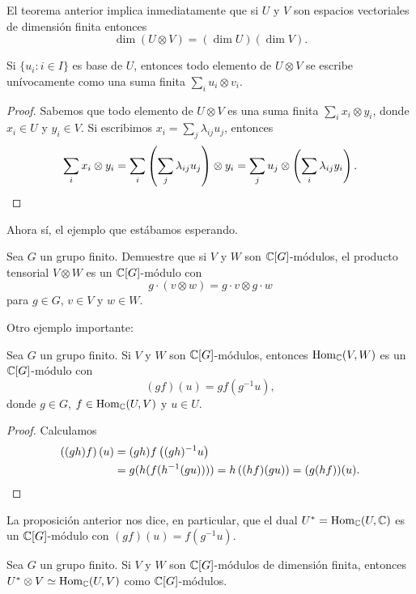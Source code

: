 El teorema anterior implica inmediatamente que si $U$ y $V$ son espacios
vectoriales de dimensión finita entonces
\[
	\dim(U\otimes V)=(\dim U)(\dim V).
\]

\begin{corollary}
	Si $\{u_i:i\in I\}$ es base de $U$, entonces todo elemento de $U\otimes V$
	se escribe unívocamente como una suma finita $\sum_{i}u_i\otimes v_i$.
\end{corollary}

\begin{proof}
	Sabemos que todo elemento de $U\otimes V$ es una suma finita
	$\sum_i x_i\otimes y_i$, donde $x_i\in U$ y $y_i\in V$. Si escribimos 
	$x_i=\sum_j\lambda_{ij}u_j$, entonces
	\[
		\sum_i x_i\otimes y_i=\sum_i\left(\sum_j\lambda_{ij}u_j\right)\otimes y_i		
		=\sum_j u_j\otimes\left(\sum_i\lambda_{ij}y_i\right).\qedhere
	\]
\end{proof}

Ahora sí, el ejemplo que estábamos esperando. 

\begin{exercise}
	Sea $G$ un grupo finito. Demuestre que si $V$ y $W$ son $\mathbb{C}[G]$-módulos, el producto
	tensorial $V\otimes W$ es un $\mathbb{C}[G]$-módulo con 
	\[
	g\cdot (v\otimes w)=g\cdot v\otimes
	g\cdot w
	\]
	para $g\in G$, $v\in V$ y $w\in W$.
\end{exercise}

Otro ejemplo importante:

\begin{proposition}
	Sea $G$ un grupo finito. Si $V$ y $W$ son $\mathbb{C}[G]$-módulos, entonces
	$\operatorname{Hom}_{\mathbb{C}}(V,W)$ es un $\mathbb{C}[G]$-módulo con 
	\[
	(gf)(u)=gf(g^{-1}u),
	\]
	donde $g\in G$,
	$f\in\operatorname{Hom}_{\mathbb{C}}(U,V)$ y $u\in U$.
\end{proposition}

\begin{proof}
	Calculamos
	\begin{align*}
		\left( (gh)f \right)(u)&=(gh)f\left( (gh)^{-1}u \right)\\
		&=g(h(f(h^{-1}(gu))))=h\left( (hf)(gu) \right)=(g(hf))(u).\qedhere
	\end{align*}
\end{proof}

La proposición anterior nos dice, en particular, que el dual
$U^*=\operatorname{Hom}_{\mathbb{C}}(U,\mathbb{C})$ es un $\mathbb{C}[G]$-módulo con $(gf)(u)=f(g^{-1}u)$. 

\begin{exercise}
	Sea $G$ un grupo finito. Si $V$ y $W$ son $\mathbb{C}[G]$-módulos de dimensión finita, entonces
	$U^*\otimes V\simeq\operatorname{Hom}_{\mathbb{C}}(U,V)$ 
	como $\mathbb{C}[G]$-módulos.
\end{exercise}